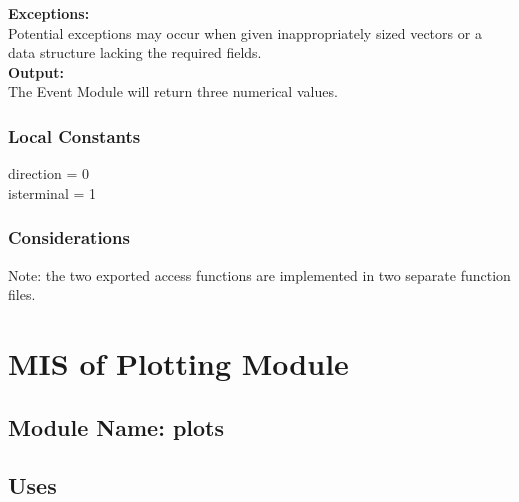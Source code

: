 \documentclass[12pt]{article}
\begin{document}
\noindent \textbf{Exceptions:}\\
Potential exceptions may occur when given inappropriately sized
vectors or a data structure lacking the required fields.\\

\noindent \textbf{Output:}\\
The Event Module will return three numerical values.  \\

\subsubsection{Local Constants}
direction = 0\\
isterminal = 1\\

\subsubsection{Considerations}
Note: the two exported access functions are implemented in two separate function files.


\section{MIS of Plotting Module}

\subsection{Module Name: plots}

\subsection{Uses}



\end{document}
